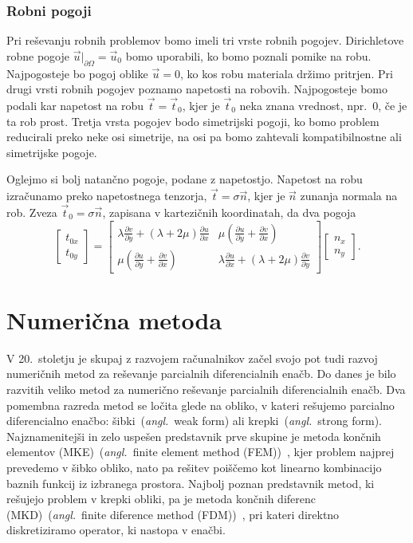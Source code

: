 \documentclass[12pt,a4paper,twoside]{article}
\theoremstyle{definition} %
\theoremstyle{plain} %
\numberwithin{equation}{section}
\newcommand{\dpar}[2]{\ensuremath{\frac{\partial #1}{\partial #2}}}
\newcommand{\vt}{\vec{t}}
\newcommand{\vu}{\vec{u}}
\newcommand{\vn}{\vec{n}}
\newcommand{\ts}{\sigma}
\newcommand{\ang}[1]{(\hspace{-1.5px}\textit{angl.}\ #1)}
\let\oldsection\section
\def\section{\cleardoublepage\oldsection}
\begin{document}
\subsubsection{Robni pogoji}
Pri reševanju robnih problemov bomo imeli tri vrste robnih pogojev. Dirichletove robne pogoje
$\vu|_{\partial \Omega} = \vu_0$ bomo uporabili, ko bomo poznali pomike na robu. Najpogosteje bo pogoj
oblike $\vu = 0$, ko kos robu materiala držimo pritrjen. Pri drugi vrsti robnih pogojev poznamo
napetosti na robovih. Najpogosteje bomo podali kar napetost na robu $\vt = \vt_0$, kjer je $\vt_0$
neka znana vrednost, npr.~0, če je ta rob prost. Tretja vrsta pogojev bodo simetrijski pogoji, ko
bomo problem reducirali preko neke osi simetrije, na osi pa bomo zahtevali kompatibilnostne ali
simetrijske pogoje.

Oglejmo si bolj natančno pogoje, podane z napetostjo. Napetost na robu izračunamo preko napetostnega
tenzorja, $\vt = \ts\vn$, kjer je $\vn$ zunanja normala na rob. Zveza $\vt_0 = \ts\vn$, zapisana v
kartezičnih koordinatah, da dva pogoja
\begin{equation}
  \begin{bmatrix}
    t_{0x} \\ t_{0y}
  \end{bmatrix}
  =
  \begin{bmatrix}
    \lambda \dpar{v}{y} + (\lambda+2\mu) \dpar{u}{x} &
    \mu(\dpar{u}{y} + \dpar{v}{x}) \\
    \mu(\dpar{u}{y} + \dpar{v}{x}) &
    \lambda \dpar{u}{x} + (\lambda+2\mu) \dpar{v}{y}
  \end{bmatrix}
  \begin{bmatrix}
    n_x \\ n_y
  \end{bmatrix}.
\end{equation}

\section{Numerična metoda}
\label{sec:numericna-metoda}

V 20.~stoletju je skupaj z razvojem računalnikov začel svojo pot tudi razvoj numeričnih metod za
reševanje parcialnih diferencialnih enačb. Do danes je bilo razvitih veliko metod za numerično
reševanje parcialnih diferencialnih enačb. Dva pomembna razreda metod se ločita glede na obliko, v
kateri rešujemo parcialno diferencialno enačbo: šibki~\ang{weak form} ali krepki~\ang{strong form}.
Najznamenitejši in zelo uspešen predstavnik prve skupine je metoda končnih elementov
(MKE)~\ang{finite element method (FEM)}~\cite[str.\ 340]{kozak2008numericna}, kjer problem najprej
prevedemo v šibko obliko, nato pa rešitev poiščemo kot linearno kombinacijo baznih funkcij iz
izbranega prostora. Najbolj poznan predstavnik metod, ki rešujejo problem v krepki obliki, pa je
metoda končnih diferenc (MKD)~\ang{finite diference method (FDM)}~\cite[str.
296]{kozak2008numericna}, pri kateri direktno diskretiziramo operator, ki nastopa v enačbi.
\end{document}
